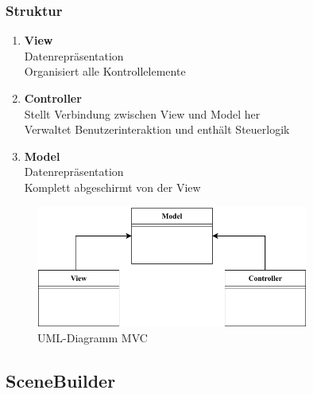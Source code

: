 \subsubsection{Struktur}
\begin{enumerate}
    \item \textbf{View}  \\
    Datenrepräsentation\\
    Organisiert alle Kontrollelemente
    \item \textbf{Controller} \\
    Stellt Verbindung zwischen View und Model her\\
    Verwaltet Benutzerinteraktion und enthält Steuerlogik
    \item \textbf{Model} \\
    Datenrepräsentation\\
    Komplett abgeschirmt von der View
\end{enumerate}
\begin{figure}[H]
    \centering
    \includegraphics[width=0.8\textwidth]{fig/ainf/ModelViewController.pdf}
    \caption{UML-Diagramm MVC}
    \label{fig:UML-Diagramm MVC}
\end{figure}
\subsection{SceneBuilder}\label{subsec:scenebuilder}

